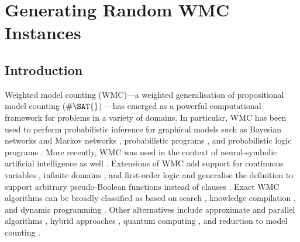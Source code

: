 \chapter{Generating Random WMC Instances} \label{chapter:comparison}

\section{Introduction}

Weighted model counting (\textsf{WMC})---a weighted generalisation of
propositional model counting ($\#\SAT{}$)
\citep{DBLP:journals/ai/ChaviraD08}---has emerged as a powerful computational
framework for problems in a variety of domains. In particular, \textsf{WMC} has
been used to perform probabilistic inference for graphical models such as
Bayesian networks and Markov networks
\citep{DBLP:conf/ecai/BartKLM16,DBLP:conf/ijcai/ChaviraD05,DBLP:conf/sat/ChaviraD06,DBLP:conf/kr/Darwiche02,DBLP:conf/aaai/SangBK05},
probabilistic programs \citep{DBLP:journals/pacmpl/HoltzenBM20}, and
probabilistic logic programs \citep{DBLP:journals/tplp/FierensBRSGTJR15}. More
recently, \textsf{WMC} was used in the context of neural-symbolic artificial
intelligence as well \citep{DBLP:conf/icml/XuZFLB18}. Extensions of \textsf{WMC}
add support for continuous variables \citep{DBLP:conf/ijcai/BellePB15}, infinite
domains \citep{DBLP:conf/aaai/Belle17}, and first-order logic
\citep{DBLP:conf/ijcai/BroeckTMDR11,DBLP:journals/cacm/GogateD16} and generalise
the definition to support arbitrary pseudo-Boolean functions instead of clauses
\citep{DBLP:conf/sat/DilkasB21}. Exact \textsf{WMC} algorithms can be broadly
classified as based on search
\citep{DBLP:conf/sat/SangBBKP04,DBLP:conf/ijcai/SharmaRSM19}, knowledge
compilation
\citep{DBLP:conf/ecai/Darwiche04,DBLP:conf/ijcai/LagniezM17,DBLP:conf/ijcai/OztokD15},
and dynamic programming \citep{DBLP:conf/aaai/DudekPV20,DBLP:conf/cp/DudekPV20}.
Other alternatives include approximate \citep{DBLP:conf/aaai/RenkensKBR14} and
parallel algorithms \citep{DBLP:conf/pgm/DalLL18,DBLP:conf/esa/FichteHWZ18},
hybrid approaches \citep{DBLP:conf/sat/HecherTW20}, quantum computing
\citep{DBLP:conf/ecai/Riguzzi20}, and reduction to model counting
\citep{DBLP:conf/ijcai/ChakrabortyFMV15}.

